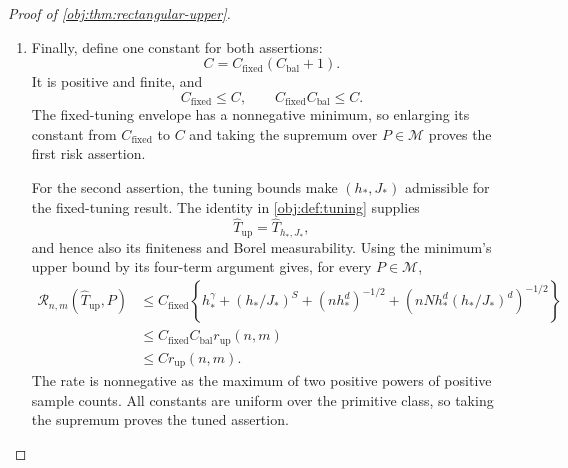 \documentclass[11pt]{article}
\begin{document}
\begin{proof}[Proof of \cref{obj:thm:rectangular-upper}]
\begin{enumerate}
The oracle bandwidth inequality also reads
\[
(n^2)^{-1/(2\Delta_{\mathrm{o}})}
=u_{\mathrm{o}}\le2h_*.
\]
Taking logarithms gives
\[
-\log(n^2)
\le2\Delta_{\mathrm{o}}(\log2+\log h_*).
\]
Using \(2\Delta_{\mathrm{o}}-2d=4\gamma\), we obtain
\[
\begin{aligned}
\log\left((n^2h_*^{2d})^{-1/2}\right)
&=-\frac12\left(\log(n^2)+2d\log h_*\right)\\
&\le\Delta_{\mathrm{o}}\log2+2\gamma\log h_*.
\end{aligned}
\]
Since \(N\ge n\) and \(h_*^{2\gamma}\le h_*^\gamma\),
\[
\begin{aligned}
\left(nNh_*^d(h_*/J_*)^d\right)^{-1/2}
&=(nNh_*^{2d})^{-1/2}\\
&\le(n^2h_*^{2d})^{-1/2}\\
&\le2^{\Delta_{\mathrm{o}}}h_*^{2\gamma}\\
&\le c_{\mathrm{rect}}h_*^\gamma.
\end{aligned}
\]
Thus both cases give admissible tuning and the four-term balance
\[
\begin{gathered}
0<h_*\le\frac12,\qquad 1\le J_*,\\
h_*^\gamma+(h_*/J_*)^S+(nh_*^d)^{-1/2}
+\left(nNh_*^d(h_*/J_*)^d\right)^{-1/2}\\
\le(2+c_{\mathrm{lab}}+c_{\mathrm{rect}})h_*^\gamma
\le C_{\mathrm{bal}}r_{\mathrm{up}}(n,m).
\end{gathered}
\]%

\item Finally, define one constant for both assertions:
\[
C=C_{\mathrm{fixed}}(C_{\mathrm{bal}}+1).
\]
It is positive and finite, and
\[
C_{\mathrm{fixed}}\le C,\qquad
C_{\mathrm{fixed}}C_{\mathrm{bal}}\le C.
\]
The fixed-tuning envelope has a nonnegative minimum, so enlarging its constant from \(C_{\mathrm{fixed}}\) to \(C\) and taking the supremum over \(P\in\mathcal M\) proves the first risk assertion.

For the second assertion, the tuning bounds make
\((h_*,J_*)\) admissible for the fixed-tuning result. The identity in
\cref{obj:def:tuning} supplies
\[
\widehat T_{\mathrm{up}}=\widehat T_{h_*,J_*},
\]
and hence also its finiteness and Borel measurability. Using the minimum's upper bound by its four-term argument gives, for every \(P\in\mathcal M\),
\[
\begin{aligned}
\mathcal R_{n,m}(\widehat T_{\mathrm{up}},P)
&\le C_{\mathrm{fixed}}
 \left\{h_*^\gamma+(h_*/J_*)^S+(nh_*^d)^{-1/2}
 +\left(nNh_*^d(h_*/J_*)^d\right)^{-1/2}\right\}\\
&\le C_{\mathrm{fixed}}C_{\mathrm{bal}}r_{\mathrm{up}}(n,m)\\
&\le Cr_{\mathrm{up}}(n,m).
\end{aligned}
\]
The rate is nonnegative as the maximum of two positive powers of positive sample counts. All constants are uniform over the primitive class, so taking the supremum proves the tuned assertion.%
\end{enumerate}
\end{proof}
\end{document}
